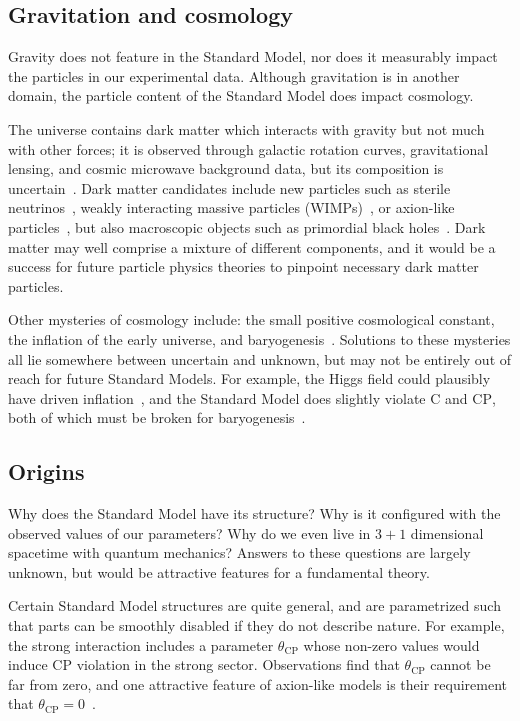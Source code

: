 \subsection{Gravitation and cosmology}
Gravity does not feature in the Standard Model, nor does it measurably impact
the particles in our experimental data.
Although gravitation is in another domain, the particle content of the
Standard Model does impact cosmology.

The universe contains dark matter which interacts with gravity but not much
with other forces; it is observed through galactic rotation curves,
gravitational lensing, and cosmic microwave background data,
but its composition is uncertain~\cite{
begeman1991rotation,
garrett2010dark,
planck2020results
}.
Dark matter candidates include new particles such as
sterile neutrinos~\cite{boyarsky2019sterile},
weakly interacting massive particles (WIMPs)~\cite{jungman1996wimp},
or
axion-like particles~\cite{kim2008axions},
but also macroscopic objects such as
primordial black holes~\cite{bernard2019primordial}.
Dark matter may well comprise a mixture of different components, and it would
be a success for future particle physics theories to pinpoint necessary dark
matter particles.

Other mysteries of cosmology include:
the small positive cosmological constant,
the inflation of the early universe,
and baryogenesis~\cite{
wells2020discovery,
riess1998observational
}.
Solutions to these mysteries all lie somewhere between uncertain and unknown,
but may not be entirely out of reach for future Standard Models.
For example, the Higgs field could plausibly have driven
inflation~\cite{bezrukov2008higgs},
and the Standard Model does slightly violate $\mathrm{C}$ and $\mathrm{CP}$,
both of which must be broken for baryogenesis~\cite{sakharov1991re}.


\subsection{Origins}
Why does the Standard Model have its structure?
Why is it configured with the observed values of our parameters?
Why do we even live in $3+1$ dimensional spacetime with quantum mechanics?
Answers to these questions are largely unknown, but would be
attractive features for a fundamental theory.

Certain Standard Model structures are quite general, and are parametrized such
that parts can be smoothly disabled if they do not describe nature.
For example, the strong interaction includes a parameter $\theta_\mathrm{CP}$
whose non-zero values would induce $\mathrm{CP}$ violation in the strong
sector.
Observations find that $\theta_\mathrm{CP}$ cannot be far from zero, and one
attractive feature of axion-like models is their requirement that
$\theta_\mathrm{CP} = 0$~\cite{
kim2008axions,
thomson2013modern,
martin2017particle
}.

